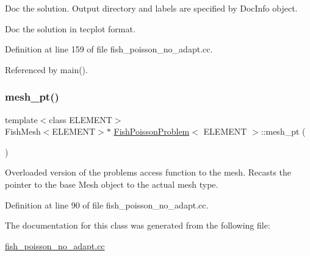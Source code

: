 Doc the solution. Output directory and labels are specified by Doc\+Info object. 

Doc the solution in tecplot format. 

Definition at line 159 of file fish\+\_\+poisson\+\_\+no\+\_\+adapt.\+cc.



Referenced by main().

\mbox{\label{classFishPoissonProblem_a084fca53b2a82803d07326ba27af75ec}} 
\subsubsection{\texorpdfstring{mesh\+\_\+pt()}{mesh\_pt()}}
{\footnotesize\ttfamily template$<$class E\+L\+E\+M\+E\+NT$>$ \\
Fish\+Mesh$<$E\+L\+E\+M\+E\+NT$>$$\ast$ \hyperlink{classFishPoissonProblem}{Fish\+Poisson\+Problem}$<$ E\+L\+E\+M\+E\+NT $>$\+::mesh\+\_\+pt (\begin{DoxyParamCaption}{ }\end{DoxyParamCaption})\hspace{0.3cm}{\ttfamily [inline]}}



Overloaded version of the problem\textquotesingle{}s access function to the mesh. Recasts the pointer to the base Mesh object to the actual mesh type. 



Definition at line 90 of file fish\+\_\+poisson\+\_\+no\+\_\+adapt.\+cc.



The documentation for this class was generated from the following file\+:\begin{DoxyCompactItemize}
\item 
\hyperlink{fish__poisson__no__adapt_8cc}{fish\+\_\+poisson\+\_\+no\+\_\+adapt.\+cc}\end{DoxyCompactItemize}
